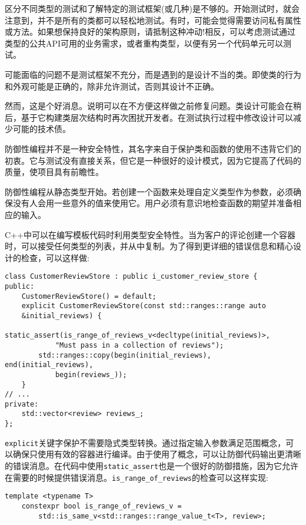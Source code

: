 
区分不同类型的测试和了解特定的测试框架(或几种)是不够的。开始测试时，就会注意到，并不是所有的类都可以轻松地测试。有时，可能会觉得需要访问私有属性或方法。如果想保持良好的架构原则，请抵制这种冲动!相反，可以考虑测试通过类型的公共API可用的业务需求，或者重构类型，以便有另一个代码单元可以测试。


可能面临的问题不是测试框架不充分，而是遇到的是设计不当的类。即使类的行为和外观可能是正确的，除非允许测试，否则其设计不正确。

然而，这是个好消息。说明可以在不方便这样做之前修复问题。类设计可能会在稍后，基于它构建类层次结构时再次困扰开发者。在测试执行过程中修改设计可以减少可能的技术债。


防御性编程并不是一种安全特性，其名字来自于保护类和函数的使用不违背它们的初衷。它与测试没有直接关系，但它是一种很好的设计模式，因为它提高了代码的质量，使项目具有前瞻性。

防御性编程从静态类型开始。若创建一个函数来处理自定义类型作为参数，必须确保没有人会用一些意外的值来使用它。用户必须有意识地检查函数的期望并准备相应的输入。

C++中可以在编写模板代码时利用类型安全特性。当为客户的评论创建一个容器时，可以接受任何类型的列表，并从中复制。为了得到更详细的错误信息和精心设计的检查，可以这样做:

\begin{lstlisting}[style=styleCXX]
class CustomerReviewStore : public i_customer_review_store {
public:
	CustomerReviewStore() = default;
	explicit CustomerReviewStore(const std::ranges::range auto
	&initial_reviews) {
		static_assert(is_range_of_reviews_v<decltype(initial_reviews)>,
			"Must pass in a collection of reviews");
		std::ranges::copy(begin(initial_reviews), end(initial_reviews),
			begin(reviews_));
	}
// ...
private:
	std::vector<review> reviews_;
};
\end{lstlisting}

\texttt{explicit}关键字保护不需要隐式类型转换。通过指定输入参数满足范围概念，可以确保只使用有效的容器进行编译。由于使用了概念，可以让防御代码输出更清晰的错误消息。在代码中使用\texttt{static\_assert}也是一个很好的防御措施，因为它允许在需要的时候提供错误消息。\texttt{is\_range\_of\_reviews}的检查可以这样实现:

\begin{lstlisting}[style=styleCXX]
template <typename T>
	constexpr bool is_range_of_reviews_v =
		std::is_same_v<std::ranges::range_value_t<T>, review>;
\end{lstlisting}

